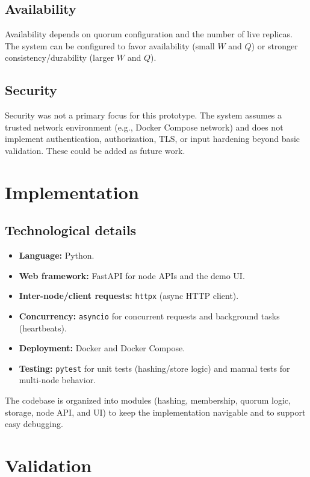 \documentclass{scrartcl}
\begin{document}
\subsection{Availability}\label{availability}
Availability depends on quorum configuration and the number of live replicas. The system can be configured to favor availability (small $W$ and $Q$) or stronger consistency/durability (larger $W$ and $Q$).

\subsection{Security}\label{security}
Security was not a primary focus for this prototype. The system assumes a trusted network environment (e.g., Docker Compose network) and does not implement authentication, authorization, TLS, or input hardening beyond basic validation. These could be added as future work.

\section{Implementation}\label{implementation}

\subsection{Technological details}\label{technological-details}
\begin{itemize}
  \item \textbf{Language:} Python.
  \item \textbf{Web framework:} FastAPI for node APIs and the demo UI.
  \item \textbf{Inter-node/client requests:} \texttt{httpx} (async HTTP client).
  \item \textbf{Concurrency:} \texttt{asyncio} for concurrent requests and background tasks (heartbeats).
  \item \textbf{Deployment:} Docker and Docker Compose.
  \item \textbf{Testing:} \texttt{pytest} for unit tests (hashing/store logic) and manual tests for multi-node behavior.
\end{itemize}

The codebase is organized into modules (hashing, membership, quorum logic, storage, node API, and UI) to keep the implementation navigable and to support easy debugging.

\section{Validation}\label{validation}
\end{document}
